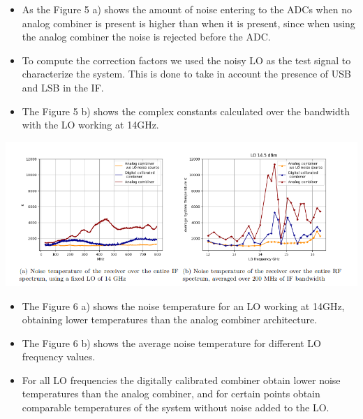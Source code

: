 \documentclass[a0paper,portrait]{baposter}
\begin{document}
\begin{poster}
{    \begin{itemize}
        \item As the Figure 5 a) shows the amount of noise entering to the ADCs when no analog combiner is present is higher than when it is present, since when using the analog combiner the noise is rejected before the ADC. 
        \item To compute the correction factors we used the noisy LO as the test signal to characterize the system. This is done to take in account the presence of USB and LSB in the IF.
        \item The Figure 5 b) shows the complex constants calculated over the bandwidth with the LO working at 14GHz.        
    \end{itemize}

    \begin{center}
        \includegraphics[width=\linewidth, height=.65\linewidth]{images/temperature.png}
    \end{center}

    \begin{itemize}
         \item The Figure 6 a) shows the noise temperature for an LO working at 14GHz, obtaining lower temperatures than the analog combiner architecture.
         \item The Figure 6 b) shows the average noise temperature for different LO frequency values.
         \item For all LO frequencies the digitally calibrated combiner obtain lower noise temperatures than the analog combiner, and for certain points obtain comparable temperatures of the system without noise added to the LO.
    \end{itemize}
}



\end{poster}
\end{document}
